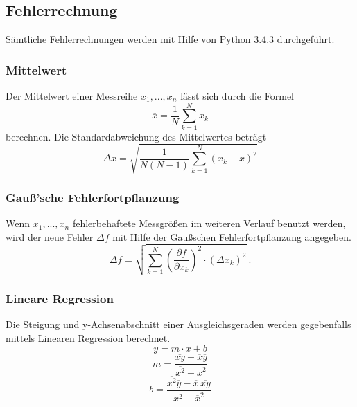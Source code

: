 \subsection{Fehlerrechnung}
Sämtliche Fehlerrechnungen werden mit Hilfe von Python 3.4.3 durchgeführt.
\subsubsection{Mittelwert}
Der Mittelwert einer Messreihe $x_1, ... ,x_n$ lässt sich durch die Formel
\begin{equation}
	\label{eqn:Mittelwert}
	\overline{x} = \frac{1}{N} \sum_{k=1}^N x_k
\end{equation}
berechnen. Die Standardabweichung des Mittelwertes beträgt 
\begin{equation}
	\label{eqn:Mittelwert_err}
	\Delta \overline{x} = \sqrt{ \frac{1}{N(N-1)} \sum_{k=1}^N (x_k - \overline{x})^2}
\end{equation}

\subsubsection{Gauß'sche Fehlerfortpflanzung}
Wenn $x_1, ..., x_n$ fehlerbehaftete Messgrößen im weiteren Verlauf benutzt werden, wird der neue Fehler $\Delta f$ mit Hilfe der Gaußschen Fehlerfortpflanzung angegeben.
\begin{equation}
	\Delta f = \sqrt{\sum_{k=1}^N \left( \frac{ \partial f}{\partial x_k} \right) ^2 \cdot (\Delta x_k)^2} \ .
\end{equation}

\subsubsection{Lineare Regression}
Die Steigung und y-Achsenabschnitt einer Ausgleichsgeraden werden gegebenfalls mittels Linearen Regression berechnet. 
\begin{equation}
	y = m \cdot x + b
\end{equation}
\begin{equation}
	m = \frac{ \overline{xy} - \overline{x} \overline{y} } {\overline{x^2} - \overline{x}^2}
\end{equation}
\begin{equation}
	b = \frac{ \overline{x^2}\overline{y} - \overline{x} \, \overline{xy}} { \overline{x^2} - \overline{x}^2}
\end{equation}
